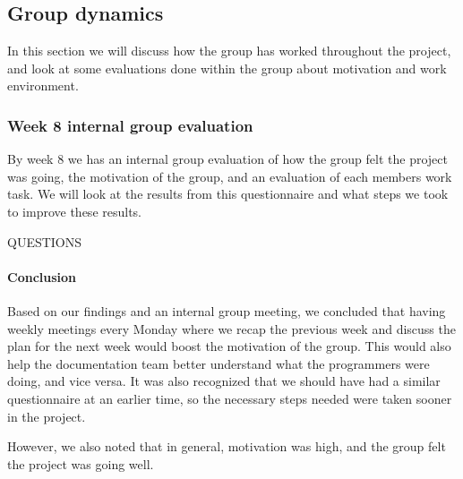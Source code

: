 \subsection{Group dynamics}
In this section we will discuss how the group has worked throughout the project, and look at some evaluations done within the group about motivation and work environment. 

\subsubsection{Week 8 internal group evaluation}
By week 8 we has an internal group evaluation of how the group felt the project was going, the motivation of the group, and an evaluation of each members work task. We will look at the results from this questionnaire and what steps we took to improve these results.

QUESTIONS

\paragraph{Conclusion}
Based on our findings and an internal group meeting, we concluded that having weekly meetings every Monday where we recap the previous week and discuss the plan for the next week would boost the motivation of the group. This would also help the documentation team better understand what the programmers were doing, and vice versa. It was also recognized that we should have had a similar questionnaire at an earlier time, so the necessary steps needed were taken sooner in the project.

However, we also noted that in general, motivation was high, and the group felt the project was going well.
